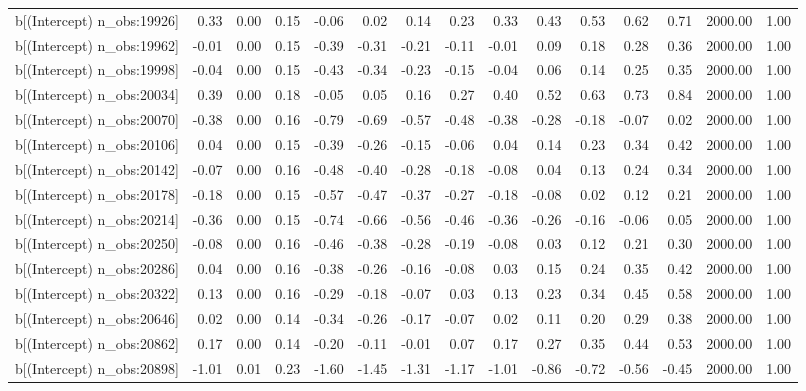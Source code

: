 \begin{table}[ht]
\begin{tabular}{rrrrrrrrrrrrrrr}
  b[(Intercept) n\_obs:19926] & 0.33 & 0.00 & 0.15 & -0.06 & 0.02 & 0.14 & 0.23 & 0.33 & 0.43 & 0.53 & 0.62 & 0.71 & 2000.00 & 1.00 \\ 
  b[(Intercept) n\_obs:19962] & -0.01 & 0.00 & 0.15 & -0.39 & -0.31 & -0.21 & -0.11 & -0.01 & 0.09 & 0.18 & 0.28 & 0.36 & 2000.00 & 1.00 \\ 
  b[(Intercept) n\_obs:19998] & -0.04 & 0.00 & 0.15 & -0.43 & -0.34 & -0.23 & -0.15 & -0.04 & 0.06 & 0.14 & 0.25 & 0.35 & 2000.00 & 1.00 \\ 
  b[(Intercept) n\_obs:20034] & 0.39 & 0.00 & 0.18 & -0.05 & 0.05 & 0.16 & 0.27 & 0.40 & 0.52 & 0.63 & 0.73 & 0.84 & 2000.00 & 1.00 \\ 
  b[(Intercept) n\_obs:20070] & -0.38 & 0.00 & 0.16 & -0.79 & -0.69 & -0.57 & -0.48 & -0.38 & -0.28 & -0.18 & -0.07 & 0.02 & 2000.00 & 1.00 \\ 
  b[(Intercept) n\_obs:20106] & 0.04 & 0.00 & 0.15 & -0.39 & -0.26 & -0.15 & -0.06 & 0.04 & 0.14 & 0.23 & 0.34 & 0.42 & 2000.00 & 1.00 \\ 
  b[(Intercept) n\_obs:20142] & -0.07 & 0.00 & 0.16 & -0.48 & -0.40 & -0.28 & -0.18 & -0.08 & 0.04 & 0.13 & 0.24 & 0.34 & 2000.00 & 1.00 \\ 
  b[(Intercept) n\_obs:20178] & -0.18 & 0.00 & 0.15 & -0.57 & -0.47 & -0.37 & -0.27 & -0.18 & -0.08 & 0.02 & 0.12 & 0.21 & 2000.00 & 1.00 \\ 
  b[(Intercept) n\_obs:20214] & -0.36 & 0.00 & 0.15 & -0.74 & -0.66 & -0.56 & -0.46 & -0.36 & -0.26 & -0.16 & -0.06 & 0.05 & 2000.00 & 1.00 \\ 
  b[(Intercept) n\_obs:20250] & -0.08 & 0.00 & 0.16 & -0.46 & -0.38 & -0.28 & -0.19 & -0.08 & 0.03 & 0.12 & 0.21 & 0.30 & 2000.00 & 1.00 \\ 
  b[(Intercept) n\_obs:20286] & 0.04 & 0.00 & 0.16 & -0.38 & -0.26 & -0.16 & -0.08 & 0.03 & 0.15 & 0.24 & 0.35 & 0.42 & 2000.00 & 1.00 \\ 
  b[(Intercept) n\_obs:20322] & 0.13 & 0.00 & 0.16 & -0.29 & -0.18 & -0.07 & 0.03 & 0.13 & 0.23 & 0.34 & 0.45 & 0.58 & 2000.00 & 1.00 \\ 
  b[(Intercept) n\_obs:20646] & 0.02 & 0.00 & 0.14 & -0.34 & -0.26 & -0.17 & -0.07 & 0.02 & 0.11 & 0.20 & 0.29 & 0.38 & 2000.00 & 1.00 \\ 
  b[(Intercept) n\_obs:20862] & 0.17 & 0.00 & 0.14 & -0.20 & -0.11 & -0.01 & 0.07 & 0.17 & 0.27 & 0.35 & 0.44 & 0.53 & 2000.00 & 1.00 \\ 
  b[(Intercept) n\_obs:20898] & -1.01 & 0.01 & 0.23 & -1.60 & -1.45 & -1.31 & -1.17 & -1.01 & -0.86 & -0.72 & -0.56 & -0.45 & 2000.00 & 1.00 \\ 

\end{tabular}
\end{table}
